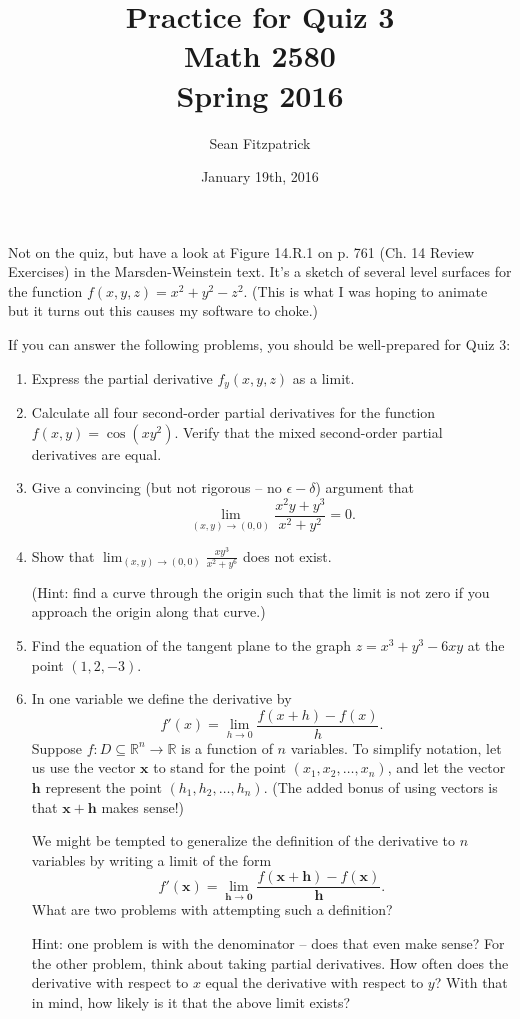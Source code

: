 \documentclass[letterpaper,12pt]{article}
\title{Practice for Quiz 3\\Math 2580\\Spring 2016}
\author{Sean Fitzpatrick}
\date{January 19th, 2016}
\newcommand{\R}{\mathbb{R}}
\begin{document}
 \maketitle
Not on the quiz, but have a look at Figure 14.R.1 on p. 761 (Ch. 14 Review Exercises) in the Marsden-Weinstein text. It's a sketch of several level surfaces for the function $f(x,y,z)=x^2+y^2-z^2$. (This is what I was hoping to animate but it turns out this causes my software to choke.)

\bigskip

If you can answer the following problems, you should be well-prepared for Quiz 3:



\begin{enumerate}
 \item Express the partial derivative $f_y(x,y,z)$ as a limit.
 \item Calculate all four second-order partial derivatives for the function $f(x,y) = \cos(xy^2)$. Verify that the mixed second-order partial derivatives are equal.
 \item Give a convincing (but not rigorous -- no $\epsilon - \delta$) argument that
\[
 \lim_{(x,y)\to (0,0)}\frac{x^2y+y^3}{x^2+y^2} = 0.
\]
 \item Show that $\displaystyle \lim_{(x,y)\to (0,0)}\frac{xy^3}{x^2+y^6}$ does not exist.

(Hint: find a curve through the origin such that the limit is not zero if you approach the origin along that curve.)


\item Find the equation of the tangent plane to the graph $z=x^3+y^3-6xy$ at the point $(1,2,-3)$.
\pagebreak
\item In one variable we define the derivative by
\[
 f'(x) = \lim_{h\to 0}\frac{f(x+h)-f(x)}{h}.
\]
Suppose $f:D\subseteq \R^n\to \R$ is a function of $n$ variables. To simplify notation, let us use the vector $\mathbf{x}$ to stand for the point $(x_1,x_2,\ldots, x_n)$, and let the vector $\mathbf{h}$ represent the point $(h_1,h_2,\ldots, h_n)$. (The added bonus of using vectors is that $\mathbf{x}+\mathbf{h}$ makes sense!)

We might be tempted to generalize the definition of the derivative to $n$ variables by writing a limit of the form
\[
 f'(\mathbf{x}) = \lim_{\mathbf{h}\to \mathbf{0}}\frac{f(\mathbf{x}+\mathbf{h})-f(\mathbf{x})}{\mathbf{h}}.
\]
What are two problems with attempting such a definition?

Hint: one problem is with the denominator -- does that even make sense? For the other problem, think about taking partial derivatives. How often does the derivative with respect to $x$ equal the derivative with respect to $y$? With that in mind, how likely is it that the above limit exists?


 
\end{enumerate}
\end{document}
